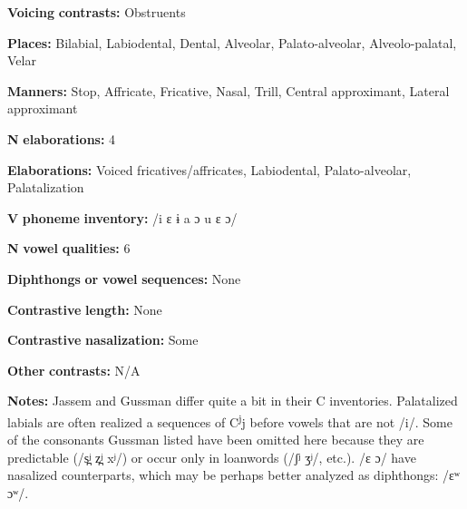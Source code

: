 \documentclass[output=paper]{langsci/langscibook}
\begin{document}
\begin{styleBody}
\textbf{Voicing} \textbf{contrasts:} Obstruents
\end{styleBody}

\begin{styleBody}
\textbf{Places:} Bilabial, Labiodental, Dental, Alveolar, Palato-alveolar, Alveolo-palatal, Velar
\end{styleBody}

\begin{styleBody}
\textbf{Manners:} Stop, Affricate, Fricative, Nasal, Trill, Central approximant, Lateral approximant
\end{styleBody}

\begin{styleBody}
\textbf{N} \textbf{elaborations:} 4
\end{styleBody}

\begin{styleBody}
\textbf{Elaborations:} Voiced fricatives/affricates, Labiodental, Palato-alveolar, Palatalization
\end{styleBody}

\begin{styleBody}
\textbf{V} \textbf{phoneme} \textbf{inventory:} /i ɛ ɨ a ɔ u ɛ ɔ/
\end{styleBody}

\begin{styleBody}
\textbf{N} \textbf{vowel} \textbf{qualities:} 6
\end{styleBody}

\begin{styleBody}
\textbf{Diphthongs} \textbf{or} \textbf{vowel} \textbf{sequences:} None
\end{styleBody}

\begin{styleBody}
\textbf{Contrastive} \textbf{length:} None
\end{styleBody}

\begin{styleBody}
\textbf{Contrastive} \textbf{nasalization:} Some
\end{styleBody}

\begin{styleBody}
\textbf{Other} \textbf{contrasts:} N/A
\end{styleBody}

\begin{styleBody}
\textbf{Notes:} Jassem and Gussman differ quite a bit in their C inventories. Palatalized labials are often realized a sequences of C\textsuperscript{j}j before vowels that are not /i/. Some of the consonants Gussman listed have been omitted here because they are predictable (/s̪ʲ z̪ʲ xʲ/) or occur only in loanwords (/ʃʲ ʒʲ/, etc.). /ɛ ɔ/ have nasalized counterparts, which may be perhaps better analyzed as diphthongs: /ɛʷ ɔʷ/.
\end{styleBody}
\end{document}
